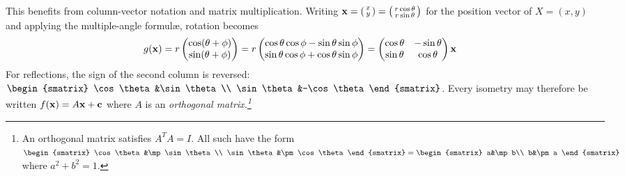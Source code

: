 This benefits from column-vector notation and matrix multiplication. Writing ${\mathbf{x}}=\left(\begin{smallmatrix}x\\y\end{smallmatrix}\right) =\left(\begin{smallmatrix}r\cos\theta\\r\sin\theta\end{smallmatrix}\right)$ for the position vector of $X=(x,y)$ and applying the multiple-angle formulæ, rotation becomes
\begin{align*}
	g({\mathbf{x}})&= r\begin{pmatrix}\cos(\theta+\phi)\\\sin(\theta+\phi)\end{pmatrix} =r\begin{pmatrix}\cos\theta\cos\phi-\sin\theta\sin\phi\\\sin\theta\cos\phi+\cos\theta\sin\phi\end{pmatrix} =
	\begin{pmatrix}
		\cos\theta&-\sin\theta\\
		\sin\theta&\cos\theta
	\end{pmatrix}{\mathbf{x}}
\end{align*}
For reflections, the sign of the second column is reversed:
$\begin{smatrix}
	\cos\theta&\sin\theta\\
	\sin\theta&-\cos\theta
\end{smatrix}$.
Every isometry may therefore be written $f({\mathbf{x}})=A{\mathbf{x}}+{\mathbf{c}}$ where $A$ is an \emph{orthogonal matrix.\footnote{An orthogonal matrix satisfies $A^TA=I$. All such have the form 
$\begin{smatrix}
	\cos\theta&\mp\sin\theta\\
	\sin\theta&\pm\cos\theta
\end{smatrix}
=
\begin{smatrix}
	a&\mp b\\
	b&\pm a
\end{smatrix}$
where $a^2+b^2=1$.}}

